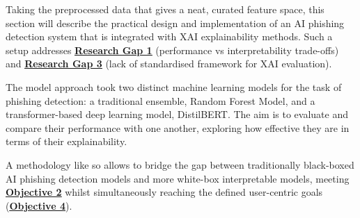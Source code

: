 
Taking the preprocessed data that gives a neat, curated feature space, this section will describe the practical design and implementation of an AI phishing detection system that is integrated with XAI explainability methods. Such a setup addresses \hyperref[research-gap-1]{\uline{\textbf{Research Gap 1}}} (performance vs interpretability trade-offs) and \hyperref[research-gap-3]{\uline{\textbf{Research Gap 3}}} (lack of standardised framework for XAI evaluation).\newline

\noindent The model approach took two distinct machine learning models for the task of phishing detection: a traditional ensemble, Random Forest Model, and a transformer-based deep learning model, DistilBERT. The aim is to evaluate and compare their performance with one another, exploring how effective they are in terms of their explainability.\newline

\noindent A methodology like so allows to bridge the gap between traditionally black-boxed AI phishing detection models and more white-box interpretable models, meeting \hyperref[objective-2]{\uline{\textbf{Objective 2}}} whilst simultaneously reaching the defined user-centric goals (\hyperref[objective-4]{\uline{\textbf{Objective 4}}}).
